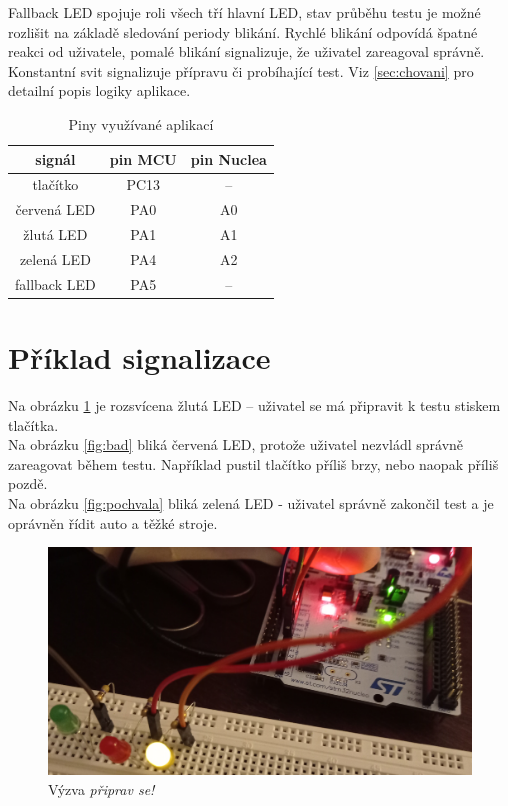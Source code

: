 \documentclass[twoside]{article}
\begin{document}
Fallback LED spojuje roli všech tří hlavní LED, stav průběhu testu je možné rozlišit na základě sledování periody blikání.
Rychlé blikání odpovídá špatné reakci od uživatele, pomalé blikání signalizuje, že uživatel zareagoval správně.
Konstantní svit signalizuje přípravu či probíhající test. Viz \ref{sec:chovani} pro detailní popis logiky aplikace.

\begin{table}[htbp]
    \centering
    \begin{tabular}{c|c|c}
        signál & pin MCU & pin Nuclea \\ \hline
        tlačítko & PC13 & -- \\
        červená LED & PA0 & A0 \\
        žlutá LED & PA1 & A1 \\
        zelená LED & PA4 & A2 \\
        fallback LED & PA5 & --
    \end{tabular}
    \caption{Piny využívané aplikací}
    \label{table:pinout}
\end{table}

\newpage
\section{Příklad signalizace}

Na obrázku \ref{fig:priprava} je rozsvícena žlutá LED -- uživatel se má připravit k testu stiskem tlačítka.\\
Na obrázku \ref{fig:bad} bliká červená LED, protože uživatel nezvládl správně zareagovat během testu.
Například pustil tlačítko příliš brzy, nebo naopak příliš pozdě.\\
Na obrázku \ref{fig:pochvala} bliká zelená LED - uživatel správně zakončil test a je oprávněn řídit auto a těžké stroje.

\begin{figure}[htbp]
    \centering
    \includegraphics[height=0.2\textheight]{priprava.jpg}
    \caption{Výzva \textit{připrav se!}}
    \label{fig:priprava}
\end{figure}
\end{document}
